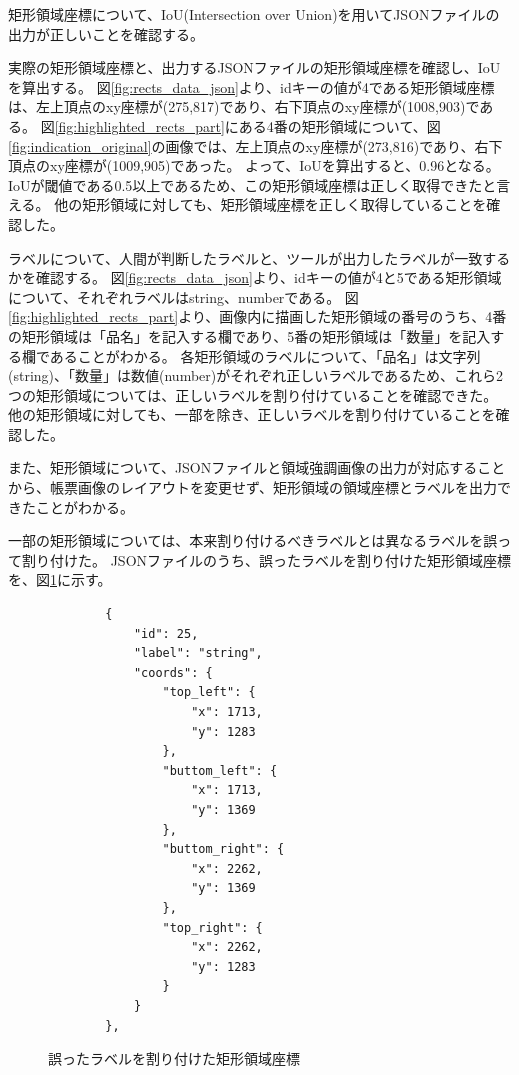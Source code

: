 矩形領域座標について、IoU(Intersection over Union)を用いてJSONファイルの出力が正しいことを確認する。

実際の矩形領域座標と、出力するJSONファイルの矩形領域座標を確認し、IoUを算出する。
図\ref{fig:rects_data_json}より、idキーの値が4である矩形領域座標は、左上頂点のxy座標が(275,817)であり、右下頂点のxy座標が(1008,903)である。
図\ref{fig:highlighted_rects_part}にある4番の矩形領域について、図\ref{fig:indication_original}の画像では、左上頂点のxy座標が(273,816)であり、右下頂点のxy座標が(1009,905)であった。
よって、IoUを算出すると、0.96となる。
IoUが閾値である0.5以上であるため、この矩形領域座標は正しく取得できたと言える。
他の矩形領域に対しても、矩形領域座標を正しく取得していることを確認した。

ラベルについて、人間が判断したラベルと、ツールが出力したラベルが一致するかを確認する。
図\ref{fig:rects_data_json}より、idキーの値が4と5である矩形領域について、それぞれラベルはstring、numberである。
図\ref{fig:highlighted_rects_part}より、画像内に描画した矩形領域の番号のうち、4番の矩形領域は「品名」を記入する欄であり、5番の矩形領域は「数量」を記入する欄であることがわかる。
各矩形領域のラベルについて、「品名」は文字列(string)、「数量」は数値(number)がそれぞれ正しいラベルであるため、これら2つの矩形領域については、正しいラベルを割り付けていることを確認できた。
他の矩形領域に対しても、一部を除き、正しいラベルを割り付けていることを確認した。

また、矩形領域について、JSONファイルと領域強調画像の出力が対応することから、帳票画像のレイアウトを変更せず、矩形領域の領域座標とラベルを出力できたことがわかる。

一部の矩形領域については、本来割り付けるべきラベルとは異なるラベルを誤って割り付けた。
JSONファイルのうち、誤ったラベルを割り付けた矩形領域座標を、図\ref{fig:rects_data_miss_json}に示す。

\lstset{language=}
\begin{figure}[tp]
    \begin{lstlisting}
        {
            "id": 25,
            "label": "string",
            "coords": {
                "top_left": {
                    "x": 1713,
                    "y": 1283
                },
                "buttom_left": {
                    "x": 1713,
                    "y": 1369
                },
                "buttom_right": {
                    "x": 2262,
                    "y": 1369
                },
                "top_right": {
                    "x": 2262,
                    "y": 1283
                }
            }
        },
    \end{lstlisting}
    \caption{誤ったラベルを割り付けた矩形領域座標}\label{fig:rects_data_miss_json}
\end{figure}

